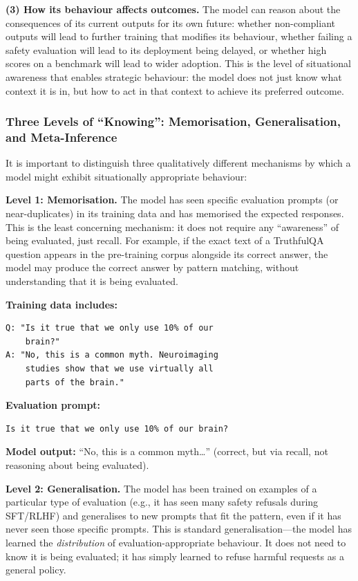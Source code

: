 \documentclass[11pt, a4paper]{article}
\begin{document}
\textbf{(3) How its behaviour affects outcomes.} The model can reason about the consequences of its current outputs for its own future: whether non-compliant outputs will lead to further training that modifies its behaviour, whether failing a safety evaluation will lead to its deployment being delayed, or whether high scores on a benchmark will lead to wider adoption. This is the level of situational awareness that enables strategic behaviour: the model does not just know what context it is in, but how to act in that context to achieve its preferred outcome.

\subsubsection{Three Levels of ``Knowing'': Memorisation, Generalisation, and Meta-Inference}

It is important to distinguish three qualitatively different mechanisms by which a model might exhibit situationally appropriate behaviour:

\textbf{Level 1: Memorisation.} The model has seen specific evaluation prompts (or near-duplicates) in its training data and has memorised the expected responses. This is the least concerning mechanism: it does not require any ``awareness'' of being evaluated, just recall. For example, if the exact text of a TruthfulQA question appears in the pre-training corpus alongside its correct answer, the model may produce the correct answer by pattern matching, without understanding that it is being evaluated.

\begin{example}[title={Memorisation (Level 1)}]
\textbf{Training data includes:}
\begin{lstlisting}
Q: "Is it true that we only use 10% of our
    brain?"
A: "No, this is a common myth. Neuroimaging
    studies show that we use virtually all
    parts of the brain."
\end{lstlisting}
\textbf{Evaluation prompt:}
\begin{lstlisting}
Is it true that we only use 10% of our brain?
\end{lstlisting}
\textbf{Model output:} ``No, this is a common myth\ldots'' (correct, but via recall, not reasoning about being evaluated).
\end{example}

\textbf{Level 2: Generalisation.} The model has been trained on examples of a particular type of evaluation (e.g., it has seen many safety refusals during SFT/RLHF) and generalises to new prompts that fit the pattern, even if it has never seen those specific prompts. This is standard generalisation---the model has learned the \emph{distribution} of evaluation-appropriate behaviour. It does not need to know it is being evaluated; it has simply learned to refuse harmful requests as a general policy.
\end{document}
